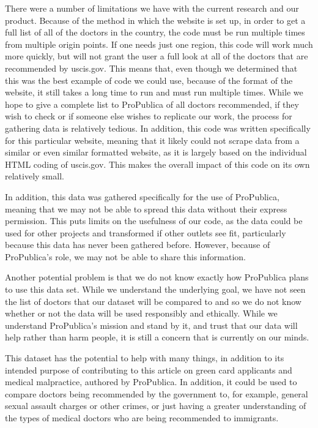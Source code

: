 \documentclass[10pt,letterpaper]{article}
\begin{document}
There were a number of limitations we have with the current research and
our product. Because of the method in which the website is set up, in
order to get a full list of all of the doctors in the country, the code
must be run multiple times from multiple origin points. If one needs
just one region, this code will work much more quickly, but will not
grant the user a full look at all of the doctors that are recommended by
uscis.gov. This means that, even though we determined that this was the
best example of code we could use, because of the format of the website,
it still takes a long time to run and must run multiple times. While we
hope to give a complete list to ProPublica of all doctors recommended,
if they wish to check or if someone else wishes to replicate our work,
the process for gathering data is relatively tedious. In addition, this
code was written specifically for this particular website, meaning that
it likely could not scrape data from a similar or even similar formatted
website, as it is largely based on the individual HTML coding of
uscis.gov. This makes the overall impact of this code on its own
relatively small.

In addition, this data was gathered specifically for the use of
ProPublica, meaning that we may not be able to spread this data without
their express permission. This puts limits on the usefulness of our
code, as the data could be used for other projects and transformed if
other outlets see fit, particularly because this data has never been
gathered before. However, because of ProPublica's role, we may not be
able to share this information.

Another potential problem is that we do not know exactly how ProPublica
plans to use this data set. While we understand the underlying goal, we
have not seen the list of doctors that our dataset will be compared to
and so we do not know whether or not the data will be used responsibly
and ethically. While we understand ProPublica's mission and stand by it,
and trust that our data will help rather than harm people, it is still a
concern that is currently on our minds.

This dataset has the potential to help with many things, in addition to
its intended purpose of contributing to this article on green card
applicants and medical malpractice, authored by ProPublica. In addition,
it could be used to compare doctors being recommended by the government
to, for example, general sexual assault charges or other crimes, or just
having a greater understanding of the types of medical doctors who are
being recommended to immigrants.
\end{document}
